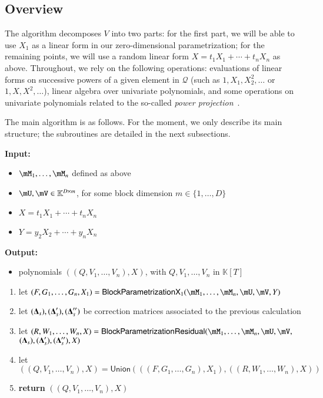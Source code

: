 \documentclass[final,1p,times,authoryear]{elsarticle}
\newcommand{\mat}[1]{\bm{\MakeUppercase{#1}}} %
\newcommand{\mainalgoname}{\mathsf{ BlockParametrization}}
\newcommand{\lf}{X}
\newcommand{\mf}{Y}
\newcommand{\residueI}{\mathscr{Q}}
\newcommand{\sqfree}{Q}
\def\K{\mathbb{K}}
\def\K {\ensuremath{\mathbb{K}}}
\begin{document}

\subsection{Overview}

The algorithm decomposes $V$ into two parts: for the first part,
we will be able to use $X_1$ as a linear form in our zero-dimensional
parametrization; for the remaining points, we will use a
random linear form $\lf=t_1 X_1 + \cdots + t_n X_n$ as
above. Throughout, we rely on the following operations: evaluations of
linear forms on successive powers of a given element in $\residueI$
(such as $1,X_1,X_2^2,\dots$ or $1,\lf,\lf^2,\dots$), linear
algebra over univariate polynomials, and some
operations on univariate polynomials related to the so-called {\em
  power projection}~\citep{Shoup94,Shoup99}.

The main algorithm is as follows. For the moment, we only describe its
main structure; the subroutines are detailed in the next subsections.

\begin{algorithm}[ht]
  \caption{$\mathsf{BlockParametrizationWithSplitting}(\mM_1,\dots,\mM_n,\mU,\mV,\lf,\mf$)}
  {\bf Input:} \vspace{-0.5em}
  \begin{itemize}
    \item $\mM_1,\dots,\mM_n$ defined as above
    \item  $\mU,\mV \in \mathbb{K}^{D \times m}$, for some block dimension  $m \in \{1,\dots,D\}$
    \item $\lf =t_1 X_1 + \cdots + t_n X_n$
    \item $\mf =y_2 X_2 + \cdots + y_n X_n$
  \end{itemize}
  {\bf Output:}  \vspace{-0.5em}
  \begin{itemize}
    \item polynomials $((\sqfree,V_1,\dots,V_n),\lf)$, with $\sqfree,V_1,\dots,V_n$ in $\K[T]$
  \end{itemize}
  \begin{enumerate}
    \item let $(F,G_1,\dots,G_n,X_1)=\mathsf{BlockParametrizationX}_1(\mM_1,\dots,\mM_n,\mU,\mV,\mf)$
    \item let $(\mat{\Delta}_s),(\mat{\Delta}'_s),(\mat{\Delta}''_s)$ be correction matrices associated
      to the previous calculation
    \item let $(R,W_1,\dots,W_n,\lf)=\mainalgoname{\sf Residual}(\mM_1,\dots,\mM_n,\mU,\mV,$ \\
      \phantom{bla} \hfill $(\mat{\Delta}_s),(\mat{\Delta}'_s),(\mat{\Delta}''_s),\lf)$
    \item let $((\sqfree,V_1,\dots,V_n),\lf)=\mathsf{Union}(((F,G_1,\dots,G_n),X_1), ((R,W_1,\dots,W_n),\lf))$
    \item \textbf{return} $((\sqfree,V_1,\dots,V_n),\lf)$
  \end{enumerate}
\end{algorithm}
\end{document}
